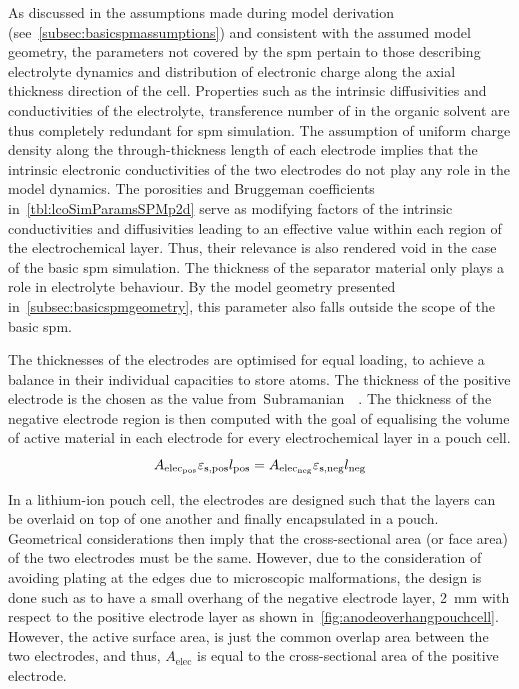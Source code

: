 As    discussed   in    the   assumptions    made   during    model   derivation
(see~\cref{subsec:basicspmassumptions})  and consistent  with the  assumed model
geometry,  the  parameters  not  covered  by  the  \gls{spm}  pertain  to  those
describing electrolyte dynamics and distribution  of electronic charge along the
axial  thickness  direction  of  the  cell. Properties  such  as  the  intrinsic
diffusivities  and conductivities  of  the electrolyte,  transference number  of
 in  the organic  solvent are thus  completely redundant  for \gls{spm}
simulation. The assumption of uniform charge density along the through-thickness
length of each electrode implies that the intrinsic electronic conductivities of
the two electrodes  do not play any  role in the model  dynamics. The porosities
and Bruggeman  coefficients in~\cref{tbl:lcoSimParamsSPMp2d} serve  as modifying
factors  of  the  intrinsic  conductivities  and  diffusivities  leading  to  an
effective value  within each  region of the  electrochemical layer.  Thus, their
relevance is also  rendered void in the case of  the basic \gls{spm} simulation.
The  thickness of  the  separator  material only  plays  a  role in  electrolyte
behaviour.  By the  model geometry  presented in~\cref{subsec:basicspmgeometry},
this parameter also falls outside the scope of the basic \gls{spm}.

The  thicknesses  of the  electrodes  are  optimised  for equal  loading,  \ie{}
to  achieve  a   balance  in  their  individual  capacities   to  store  
atoms.  The thickness  of the  positive  electrode is  the chosen  as the  value
from~Subramanian~\etal{}~\cite{Subramanian2009}. The  thickness of  the negative
electrode region  is then  computed with  the goal of  equalising the  volume of
active material  in each electrode  for every  electrochemical layer in  a pouch
cell.
\begin{equation}\label{eq:basiccapacitybalance}
    A_{\text{elec}_\text{pos}}\varepsilon_{\text{s,pos}} l_\text{pos} = A_{\text{elec}_\text{neg}}\varepsilon_{\text{s,neg}} l_\text{neg}
\end{equation}

In a  lithium-ion pouch cell, the  electrodes are designed such  that the layers
can be  overlaid on  top of  one another  and finally  encapsulated in  a pouch.
Geometrical considerations  then imply  that the  cross-sectional area  (or face
area) of the two electrodes must be  the same. However, due to the consideration
of  avoiding  plating  at  the  edges  due  to  microscopic  malformations,  the
design  is done  such as  to have  a small  overhang of  the negative  electrode
layer,  \approx\SI{2}{\milli\meter}  with  respect  to  the  positive  electrode
layer  as  shown  in~\cref{fig:anodeoverhangpouchcell}.
However, the  active surface area, is  just the common overlap  area between the
two electrodes, and  thus, $A_\text{elec}$ is equal to  the cross-sectional area
of the positive electrode.

